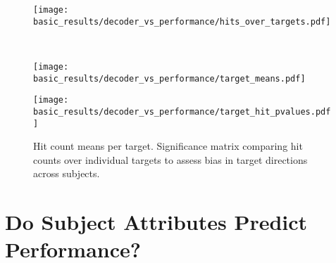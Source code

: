 \documentclass[../main.tex]{subfiles}
\begin{document}
\begin{figure}[H]%
    \centering
    \begin{minipage}{1.0\textwidth}
        \texttt{[image: basic\_results/decoder\_vs\_performance/hits\_over\_targets.pdf]}
        \subcaption{}
    \end{minipage}\\%
    \begin{minipage}{0.49\textwidth}
        \texttt{[image: basic\_results/decoder\_vs\_performance/target\_means.pdf]}
      \subcaption{}
    \end{minipage}
    \begin{minipage}{0.49\textwidth}
        \texttt{[image: basic\_results/decoder\_vs\_performance/target\_hit\_pvalues.pdf]}
      \subcaption{}
    \end{minipage}
    \caption[Hits over Targets across subjects]{Hit count means per target. Significance matrix comparing hit counts over individual targets to assess bias in target directions across subjects.}\label{fig:hits_over_targets}
\end{figure}





\section{Do Subject Attributes Predict Performance?}
\end{document}
